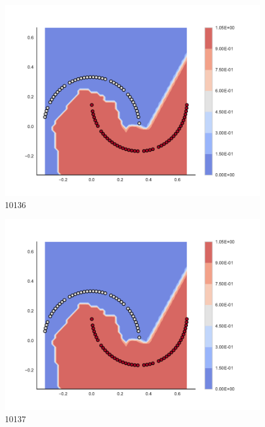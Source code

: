 \begin{subfigure}[b]{0.09\textwidth}
    \includegraphics[clip, trim=2.35cm 1.75cm 4.5cm 0cm,width=\textwidth]{img/convergence/10136.pdf}
    \caption{10136}
    \label{fig:convergence_10136}
\end{subfigure}
%
\begin{subfigure}[b]{0.09\textwidth}
    \includegraphics[clip, trim=2.35cm 1.75cm 4.5cm 0cm,width=\textwidth]{img/convergence/10137.pdf}
    \caption{10137}
    \label{fig:convergence_10137}
\end{subfigure}
%
